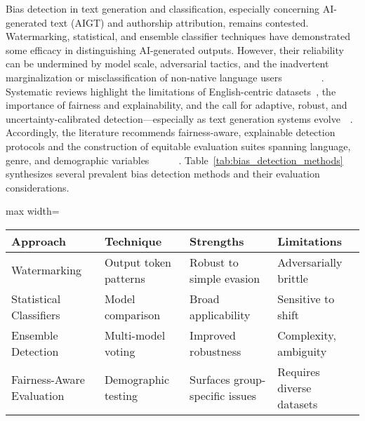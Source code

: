 \documentclass[sigconf]{acmart}
\begin{document}
Bias detection in text generation and classification, especially concerning AI-generated text (AIGT) and authorship attribution, remains contested. Watermarking, statistical, and ensemble classifier techniques have demonstrated some efficacy in distinguishing AI-generated outputs. However, their reliability can be undermined by model scale, adversarial tactics, and the inadvertent marginalization or misclassification of non-native language users~\cite{ref15}~\cite{ref40}~\cite{ref41}~\cite{ref66}~\cite{ref90}~\cite{ref93}~\cite{ref96}~\cite{ref100}. Systematic reviews highlight the limitations of English-centric datasets~\cite{ref100}, the importance of fairness and explainability, and the call for adaptive, robust, and uncertainty-calibrated detection—especially as text generation systems evolve~\cite{ref39}~\cite{ref100}. Accordingly, the literature recommends fairness-aware, explainable detection protocols and the construction of equitable evaluation suites spanning language, genre, and demographic variables~\cite{ref40}~\cite{ref70}~\cite{ref90}~\cite{ref91}~\cite{ref97}~\cite{ref98}. Table~\ref{tab:bias_detection_methods} synthesizes several prevalent bias detection methods and their evaluation considerations.

\begin{table*}[htbp]
\centering
\caption{Common bias detection approaches in AI-generated text and classifications}
\label{tab:bias_detection_methods}
\begin{adjustbox}{max width=\textwidth}
\begin{tabular}{@{}llll@{}}
\toprule
\textbf{Approach}        & \textbf{Technique}       & \textbf{Strengths}              & \textbf{Limitations}        \\
\midrule
Watermarking             & Output token patterns    & Robust to simple evasion        & Adversarially brittle       \\
Statistical Classifiers  & Model comparison        & Broad applicability             & Sensitive to shift          \\
Ensemble Detection       & Multi-model voting      & Improved robustness             & Complexity, ambiguity       \\
Fairness-Aware Evaluation& Demographic testing     & Surfaces group-specific issues  & Requires diverse datasets   \\
\bottomrule
\end{tabular}
\end{adjustbox}
\end{table*}
\end{document}
